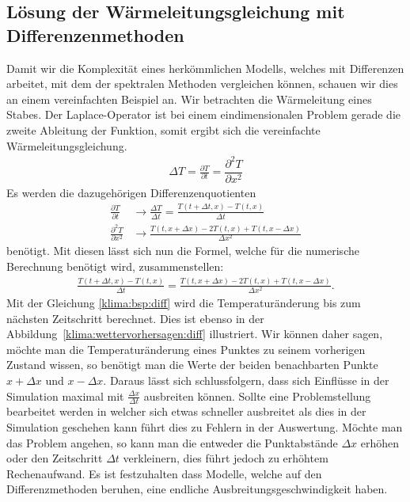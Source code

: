 \begin{refsection}
\subsection{Lösung der Wärmeleitungsgleichung mit Differenzenmethoden}
Damit wir die Komplexität eines herkömmlichen Modells, welches mit Differenzen arbeitet, mit dem der spektralen Methoden vergleichen können, schauen wir dies an einem vereinfachten Beispiel an. Wir betrachten die Wärmeleitung eines Stabes.
Der Laplace-Operator ist bei einem eindimensionalen Problem gerade die zweite Ableitung der Funktion, somit ergibt sich die vereinfachte Wärmeleitungsgleichung.
\begin{align}
\Delta T = \frac{\partial T}{\partial t}=\dfrac{\partial^2 T}{\partial x^2}
\end{align}
Es werden die dazugehörigen Differenzenquotienten
\begin{align}
\frac{\partial T}{\partial t}
&\rightarrow
\frac{\Delta T}{\Delta t}=
\frac{T(t+\Delta t,x)-T(t,x)}{\Delta t}
\\
\frac{\partial^2 T}{\partial x^2}
&\rightarrow
\frac{T(t,x+\Delta x)-2T(t,x)+T(t,x-\Delta x)}{\Delta x^2}
\end{align}
benötigt. Mit diesen lässt sich nun die Formel, welche für die numerische Berechnung benötigt wird, zusammenstellen:
\begin{align}
\frac{T(t+\Delta t,x)-T(t,x)}{\Delta t}
=
\frac{T(t,x+\Delta x)-2T(t,x)+T(t,x-\Delta x)}{\Delta x^2}.
\label{klima:bsp:diff}
\end{align}
Mit der Gleichung \eqref{klima:bsp:diff} wird die Temperaturänderung bis zum nächsten Zeitschritt berechnet. Dies ist ebenso in der Abbildung~\ref{klima:wettervorhersagen:diff} illustriert. Wir können daher sagen, möchte man die Temperaturänderung eines Punktes zu seinem vorherigen Zustand wissen, so benötigt man die Werte der beiden benachbarten Punkte $x+\Delta x$ und $x-\Delta x$. Daraus lässt sich schlussfolgern, dass sich Einflüsse in der Simulation maximal mit $\frac{\Delta x}{\Delta t}$ ausbreiten können. Sollte eine Problemstellung bearbeitet werden in welcher sich etwas schneller ausbreitet als dies in der Simulation geschehen kann führt dies zu Fehlern in der Auswertung. Möchte man das Problem angehen, so kann man die entweder die Punktabstände $\Delta x$ erhöhen oder den Zeitschritt $\Delta t$ verkleinern, dies führt jedoch zu erhöhtem Rechenaufwand. Es ist festzuhalten dass Modelle, welche auf den Differenzmethoden beruhen, eine endliche Ausbreitungsgeschwindigkeit haben.


\end{refsection}
